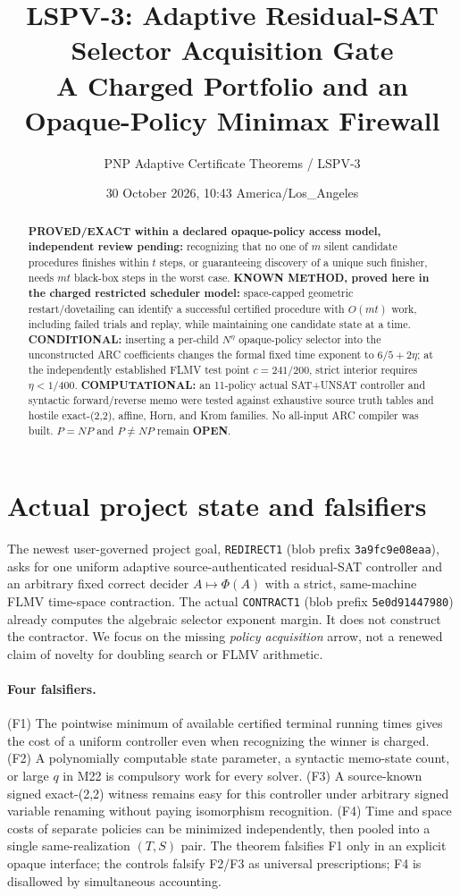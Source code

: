 \documentclass[10pt]{article}
\title{LSPV-3: Adaptive Residual-SAT Selector Acquisition Gate\\
A Charged Portfolio and an Opaque-Policy Minimax Firewall}
\author{PNP Adaptive Certificate Theorems / LSPV-3}
\date{30 October 2026, 10:43 America/Los\_Angeles}
\newcommand{\OPEN}{\textbf{OPEN}}
\begin{document}
\maketitle
\begin{abstract}
\textbf{PROVED/EXACT within a declared opaque-policy access model, independent review pending:}
recognizing that no one of $m$ silent candidate procedures finishes within $t$ steps, or guaranteeing discovery of a unique such finisher, needs $mt$ black-box steps in the worst case. \textbf{KNOWN METHOD, proved here in the charged restricted scheduler model:} space-capped geometric restart/dovetailing can identify a successful certified procedure with $O(mt)$ work, including failed trials and replay, while maintaining one candidate state at a time. \textbf{CONDITIONAL:} inserting a per-child $N^\eta$ opaque-policy selector into the unconstructed ARC coefficients changes the formal fixed time exponent to $6/5+2\eta$; at the independently established FLMV test point $c=241/200$, strict interior requires $\eta<1/400$. \textbf{COMPUTATIONAL:} an 11-policy actual SAT+UNSAT controller and syntactic forward/reverse memo were tested against exhaustive source truth tables and hostile exact-(2,2), affine, Horn, and Krom families. No all-input ARC compiler was built. $P=NP$ and $P\neq NP$ remain \OPEN.
\end{abstract}

\section{Actual project state and falsifiers}
The newest user-governed project goal, \texttt{REDIRECT1} (blob prefix \texttt{3a9fc9e08eaa}), asks for one uniform adaptive source-authenticated residual-SAT controller and an arbitrary fixed correct decider $A\mapsto\Phi(A)$ with a strict, same-machine FLMV time-space contraction. The actual \texttt{CONTRACT1} (blob prefix \texttt{5e0d91447980}) already computes the algebraic selector exponent margin. It does not construct the contractor. We focus on the missing \emph{policy acquisition} arrow, not a renewed claim of novelty for doubling search or FLMV arithmetic.

\paragraph{Four falsifiers.}
(F1) The pointwise minimum of available certified terminal running times gives the cost of a uniform controller even when recognizing the winner is charged.
(F2) A polynomially computable state parameter, a syntactic memo-state count, or large $q$ in M22 is compulsory work for every solver.
(F3) A source-known signed exact-(2,2) witness remains easy for this controller under arbitrary signed variable renaming without paying isomorphism recognition.
(F4) Time and space costs of separate policies can be minimized independently, then pooled into a single same-realization $(T,S)$ pair. The theorem falsifies F1 only in an explicit opaque interface; the controls falsify F2/F3 as universal prescriptions; F4 is disallowed by simultaneous accounting.
\end{document}
